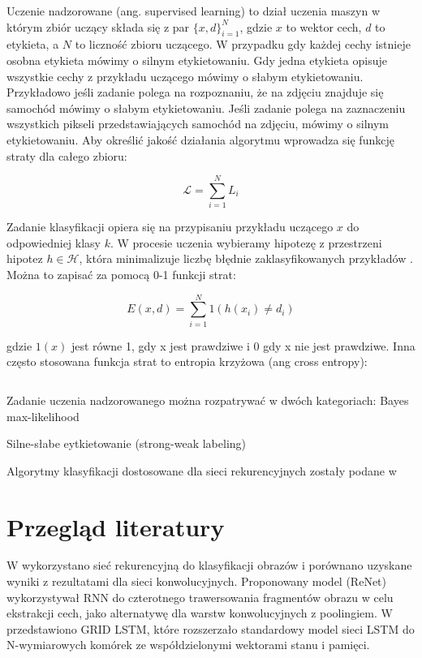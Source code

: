 \documentclass[oneside, mag]{mgr}
\begin{document}
Uczenie nadzorowane (ang. supervised learning) to dział uczenia maszyn w którym zbiór uczący składa się z par $\{x, d\}_{i=1}^N$, gdzie $x$ to wektor cech, $d$ to etykieta, a $N$ to liczność zbioru uczącego. W przypadku gdy każdej cechy istnieje osobna etykieta mówimy o silnym etykietowaniu. Gdy jedna etykieta opisuje wszystkie cechy z przykładu uczącego mówimy o słabym etykietowaniu. Przykładowo jeśli zadanie polega na rozpoznaniu, że na zdjęciu znajduje się samochód mówimy o słabym etykietowaniu. Jeśli zadanie polega na zaznaczeniu wszystkich pikseli przedstawiających samochód na zdjęciu, mówimy o silnym etykietowaniu. Aby określić jakość działania algorytmu wprowadza się funkcję straty dla całego zbioru:

\begin{equation}
	\mathcal{L} = \sum_{i=1}^N L_i
\end{equation}

Zadanie klasyfikacji opiera się na przypisaniu przykładu uczącego $x$ do odpowiedniej klasy $k$. W procesie uczenia wybieramy hipotezę z przestrzeni hipotez $h \in \mathcal{H}$, która minimalizuje liczbę błędnie zaklasyfikowanych przykładów \cite{introduction-to-machine-learning}. Można to zapisać za pomocą 0-1 funkcji strat:

\begin{equation}
	E(x, d) = \sum_{i=1}^N 1(h(x_i) \neq d_i )
\end{equation}

gdzie $1(x)$ jest równe 1, gdy x jest prawdziwe i 0 gdy x nie jest prawdziwe. Inna często stosowana funkcja strat to entropia krzyżowa (ang cross entropy):

\begin{equation}
	
\end{equation}

Zadanie uczenia nadzorowanego można rozpatrywać w dwóch kategoriach: Bayes max-likelihood

Silne-słabe eytkietowanie (strong-weak labeling)

Algorytmy klasyfikacji dostosowane dla sieci rekurencyjnych zostały podane w \cite{graves-phd}

\section{Przegląd literatury}

W \cite{DBLP:journals/corr/VisinKCMCB15} wykorzystano sieć rekurencyjną do klasyfikacji obrazów i porównano uzyskane wyniki z rezultatami dla sieci konwolucyjnych. Proponowany model (ReNet) wykorzystywał RNN do czterotnego trawersowania fragmentów obrazu w celu ekstrakcji cech, jako alternatywę dla warstw konwolucyjnych z poolingiem. W \cite{DBLP:journals/corr/KalchbrennerDG15} przedstawiono GRID LSTM, które rozszerzało standardowy model sieci LSTM do N-wymiarowych komórek ze współdzielonymi wektorami stanu i pamięci.
\end{document}
